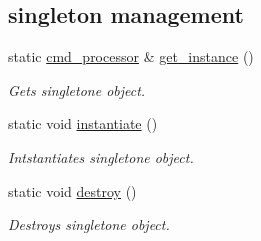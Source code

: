 \subsection*{singleton management}
\begin{DoxyCompactItemize}
\item 
\hypertarget{classcmd_1_1cmd__processor_a469ef9311a2c4dacd99172acd9568004}{static \hyperlink{classcmd_1_1cmd__processor}{cmd\-\_\-processor} \& \hyperlink{classcmd_1_1cmd__processor_a469ef9311a2c4dacd99172acd9568004}{get\-\_\-instance} ()}\label{classcmd_1_1cmd__processor_a469ef9311a2c4dacd99172acd9568004}

\begin{DoxyCompactList}\small\item\em Gets singletone object. \end{DoxyCompactList}\item 
\hypertarget{classcmd_1_1cmd__processor_af1575ac253ee9b68a0f90fb1151635a8}{static void \hyperlink{classcmd_1_1cmd__processor_af1575ac253ee9b68a0f90fb1151635a8}{instantiate} ()}\label{classcmd_1_1cmd__processor_af1575ac253ee9b68a0f90fb1151635a8}

\begin{DoxyCompactList}\small\item\em Intstantiates singletone object. \end{DoxyCompactList}\item 
\hypertarget{classcmd_1_1cmd__processor_a5cfe052f862135f78149afcfbb822fbd}{static void \hyperlink{classcmd_1_1cmd__processor_a5cfe052f862135f78149afcfbb822fbd}{destroy} ()}\label{classcmd_1_1cmd__processor_a5cfe052f862135f78149afcfbb822fbd}

\begin{DoxyCompactList}\small\item\em Destroys singletone object. \end{DoxyCompactList}\end{DoxyCompactItemize}
